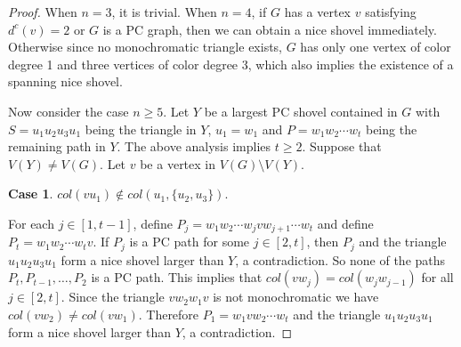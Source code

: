 \documentclass[10pt,a4paper]{article}
\theoremstyle{definition}
\newtheorem{case}{Case}
\begin{document}
\begin{proof}
    When $n=3$, it is trivial.
    When $n=4$, if $G$ has a vertex $v$ satisfying $d^c(v)=2$ or $G$ is a PC graph, then we can obtain a nice shovel immediately. Otherwise since no monochromatic triangle exists, $G$ has only one vertex of color degree 1 and three vertices of color degree 3, which also implies the existence of a spanning nice shovel.

    Now consider the case $n\geq5$. Let $Y$ be a largest PC shovel contained in $G$ with $S=u_1u_2u_3u_1$ being the triangle in $Y$, $u_1=w_1$ and $P=  w_1w_2\cdots w_t$ being the remaining path in $Y$. The above analysis implies $t\geq 2$. Suppose that $V(Y)\neq V(G)$. Let $v$ be a vertex in $V(G)\setminus V(Y)$.

    \begin{case}
         $col(vu_1)\not\in col(u_1,\{u_2,u_3\})$.
    \end{case}
    For each $j\in [1,t-1]$, define $P_j=w_1w_2\cdots w_jvw_{j+1}\cdots w_t$ and define $P_t=w_1w_2\cdots w_tv$. If $P_j$ is a PC path for some $j\in [2,t]$, then $P_j$ and the triangle $u_1u_2u_3u_1$ form a nice shovel larger than $Y$, a contradiction. So none of the paths $P_t,P_{t-1},\ldots, P_2$ is a PC path. This implies that $col(vw_j)=col(w_jw_{j-1})$ for all $j\in [2,t]$. Since the triangle $vw_2w_1v$ is not monochromatic we have $col(vw_2)\neq col(vw_1)$.  Therefore $P_1=w_1vw_2\cdots w_t$ and the triangle $u_1u_2u_3u_1$ form a nice shovel larger than $Y$, a contradiction.


\end{proof}
\end{document}
